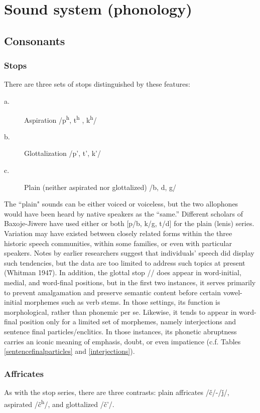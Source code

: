 \documentclass[output=paper]{LSP/langsci}
\begin{document}
\section {Sound system (phonology)}	
		
\subsection{Consonants} 		     	                     	
\subsubsection{Stops} There are three sets of stops distinguished by these features: 	     
\begin{description}
\item[a.] Aspiration  /p\textsuperscript{h}, t\textsuperscript{h} , k\textsuperscript{h}/
\item[b.] Glottalization /p', t', k'/
\item[c.] Plain (neither aspirated nor glottalized) /b, d, g/	
\end{description}   		         		
The ``plain" sounds can be either voiced or voiceless, but the two allophones would have been heard by native speakers as the ``same.''  Different scholars of Baxoje-Jiwere have used either or both [p/b, k/g, t/d] for the plain (lenis) series. Variation may have existed between closely related forms within the three historic speech communities, within some families, or even with particular speakers.  Notes by earlier researchers suggest that individuals' speech did display such tendencies, but the data are too limited to address such topics at present (Whitman 1947). In addition, the glottal stop // does appear in word-initial, medial, and word-final positions, but in the first two instances, it serves primarily to prevent amalgamation and preserve semantic content before certain vowel-initial morphemes such as verb stems.  In those settings, its function is morphological, rather than phonemic per se. Likewise, it tends to appear in word-final position only for a limited set of morphemes, namely interjections and sentence final particles/enclitics.  In those instances, its phonetic abruptness carries an iconic meaning of emphasis, doubt, or even impatience (c.f. Tables \ref{sentencefinalparticles} and \ref{interjections}). 

\subsubsection{Affricates}  As with the stop series, there are three contrasts:  plain affricates /\v{c}/-/\v{j}/, aspirated /\v{c}\textsuperscript{h}/,  and glottalized /\v{c}'/. 
\end{document}
